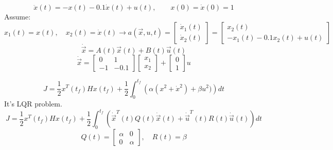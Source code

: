 $$\ddot x(t) = -x(t) - 0.1\dot x(t) + u(t), \qquad x(0) = \dot x(0) = 1 $$
Assume:
$$x_1(t) = x(t), \quad x_2(t) = \dot x(t) \to a(\vec x, u, t) =
 \begin{bmatrix}
	\dot x_1(t)\\
	\dot x_2(t)
\end{bmatrix}
= \begin{bmatrix}
	x_2(t)\\
	-x_1(t)- 0.1x_2(t) + u(t) 
\end{bmatrix}  $$
\begin{equation}
	\dot{\vec{x}} = A(t)\vec{x}(t) + B(t)\vec{u}(t)
\end{equation}
\begin{equation}\label{SystemDynamicsQ3_base}
	\dot{\vec{x}} = \begin{bmatrix}
		0 & 1 \\
		-1 & -0.1
	\end{bmatrix} \begin{bmatrix}
	x_1 \\
	x_2
\end{bmatrix} + \begin{bmatrix}
0 \\
1
\end{bmatrix} u
\end{equation}

$$J = \dfrac 12 x^T(t_f)Hx(t_f) + \dfrac 12 \int_0^{t_f}\left(\alpha(x^2 + \dot x^2) + \beta u^2) \right)dt $$
It's LQR problem.
\begin{equation}\label{CostLQRQ3}
	J = \dfrac 12 x^T(t_f)Hx(t_f) + \dfrac 12 \int_0^{t_f}\left(\dot{\vec{x}}^T(t)Q(t)\dot{\vec{x}}(t) + \dot{\vec{u}}^T(t)R(t)\dot{\vec{u}}(t) \right)dt
\end{equation}
$$
Q(t) = \begin{bmatrix}
	\alpha & 0 \\
	0      & \alpha
\end{bmatrix} , \quad R(t) = \beta
$$